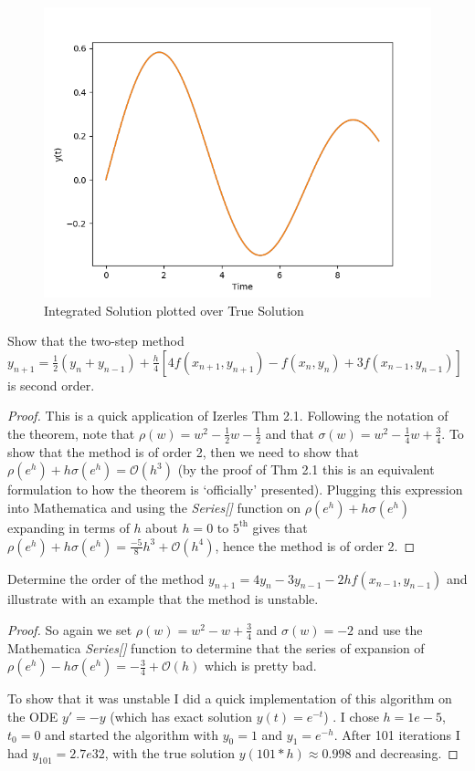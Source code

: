 \documentclass[10pt,a4paper]{article}
\newenvironment{problem}[2][Problem]{\begin{trivlist}
\item[\hskip \labelsep {\bfseries #1}\hskip \labelsep {\bfseries #2.}]}{\end{trivlist}}
\begin{document}
\begin{figure}
\centering
\includegraphics{./Figs/plot.png}
\caption{Integrated Solution plotted over True Solution}
\end{figure}

\begin{problem}{2}
Show that the two-step method $y_{n+1} = \frac{1}{2}(y_n + y_{n-1}) + \frac{h}{4}[4f(x_{n+1},y_{n+1}) - f(x_n,y_n) + 3 f(x_{n-1}, y_{n-1})]$ is second order.
\end{problem}
\begin{proof}
  This is a quick application of Izerles Thm 2.1.  Following the notation of the theorem, note that $\rho(w) =  w^2 - \frac{1}{2} w - \frac{1}{2}$ and that $\sigma(w) = w^2 - \frac{1}{4} w + \frac{3}{4}$.  To show that the method is of order 2, then we need to show that $\rho(e^h) + h \sigma(e^h) = \mathcal{O}(h^3)$ (by the proof of Thm 2.1 this is an equivalent formulation to how the theorem is `officially' presented).  Plugging this expression into Mathematica and using the \textit{Series[]} function on $\rho(e^h) + h \sigma(e^h)$ expanding in terms of $h$ about $h=0$ to $5^{\text{th}}$ gives that $\rho(e^h) + h \sigma(e^h) = \frac{-5}{8} h^3 + \mathcal{O}(h^4)$, hence the method is of order 2.
\end{proof}

\begin{problem}{3}
Determine the order of the method $y_{n+1}  = 4 y_n - 3 y_{n-1} - 2h f(x_{n-1}, y_{n-1})$ and illustrate with an example that the method is unstable.
\end{problem}
\begin{proof}
So again we set $\rho(w) = w^2 - w + \frac{3}{4}$ and $\sigma(w) = -2$ and use the Mathematica \textit{Series[]} function to determine that the series of expansion of $\rho(e^h) - h \sigma(e^h) = -\frac{3}{4} + \mathcal{O}(h)$ which is pretty bad.

To show that it was unstable I did a quick implementation of this algorithm on the ODE $y'=-y$ (which has exact solution $y(t) = e^{-t}$) .  I chose $h = 1e-5$, $t_0 =0$ and started the algorithm with $y_0 = 1$ and $y_1 = e^{-h}$.  After 101 iterations I had $y_{101} = 2.7e32$, with the true solution $y(101*h) \approx 0.998$ and decreasing. 
\end{proof}
\end{document}
